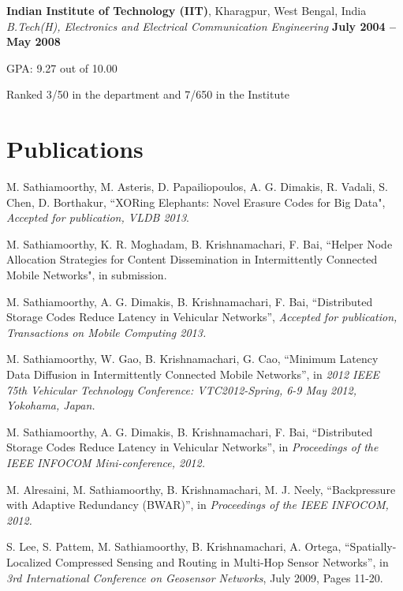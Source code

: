 \documentclass[margin,line]{resume}
\begin{document}
\begin{resume}
    
    \textbf{Indian Institute of Technology (IIT)}, Kharagpur, West Bengal, India \\%
    \textsl{B.Tech(H), Electronics and Electrical Communication Engineering} \hfill \textbf{ July 2004 -- May 2008}\vspace{-3mm}\\\vspace{-1mm}%
    \begin{list2}
    		\item GPA:	9.27 out of 10.00
    		\item Ranked 3/50 in the department and 7/650 in the Institute        
    \end{list2}\vspace{-1.5mm}%


\section{\mysidestyle Publications}
\begin{list2}  
   \item M. Sathiamoorthy, M. Asteris, D. Papailiopoulos, A. G. Dimakis, R. Vadali, S. Chen, D. Borthakur,
      ``XORing Elephants: Novel Erasure Codes for Big Data", \textsl{Accepted for publication, VLDB 2013}.
      \item M. Sathiamoorthy, K. R. Moghadam, B. Krishnamachari, F. Bai, ``Helper Node Allocation Strategies for Content Dissemination in Intermittently Connected Mobile Networks", in submission.
     \item M. Sathiamoorthy, A. G. Dimakis, B. Krishnamachari, F. Bai, 
     ``Distributed Storage Codes Reduce Latency in Vehicular Networks'', \textsl{Accepted for publication, Transactions on Mobile Computing 2013.}
      \item M. Sathiamoorthy, W. Gao, B. Krishnamachari, G. Cao,
    ``Minimum Latency Data Diffusion in Intermittently Connected Mobile Networks'', in
    \textsl{2012 IEEE 75th Vehicular Technology Conference: VTC2012-Spring, 6-9 May 2012, Yokohama, Japan.}
    \item M. Sathiamoorthy, A. G. Dimakis, B. Krishnamachari, F. Bai, 
    ``Distributed Storage Codes Reduce Latency in Vehicular Networks'', in
    \textsl{Proceedings of the IEEE INFOCOM Mini-conference, 2012.}
    \item M. Alresaini, M. Sathiamoorthy, B. Krishnamachari, M. J. Neely, ``Backpressure with Adaptive Redundancy (BWAR)'', 
    in \textsl{Proceedings of the IEEE INFOCOM, 2012.}
    \item S. Lee, S. Pattem, M. Sathiamoorthy, B. Krishnamachari, A. Ortega, ``Spatially-Localized Compressed Sensing and Routing in Multi-Hop Sensor Networks'', in \textsl{3rd International Conference on Geosensor Networks}, July 2009, Pages 11-20.  
    \end{list2}


\end{resume}
\end{document}
